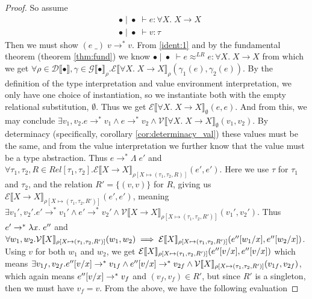 \documentclass[twoside,11pt,openright]{report}
\theoremstyle{definition}
\newcommand{\var}{x}
\newcommand{\expr}{e}
\newcommand{\val}{v}
\newcommand{\valB}{w}
\newcommand{\Tvar}{X}
\newcommand{\Tlam}{\Lambda\;}
\newcommand{\Tapp}[1]{#1\;\_}
\newcommand{\subst}[3]{#1{\left[#3 \middle/ #2 \right]}}
\newcommand{\Tfunc}[2]{#1 \rightarrow #2}
\newcommand{\Tall}[2]{\forall #1.\; #2}
\newcommand{\typ}{\tau}
\newcommand{\emptenv}{\bullet}
\newcommand{\empvenv}{\bullet}
\newcommand{\jdg}[4]{#1 \; | \; #2 \; \vdash #3 : #4}
\newcommand{\jdgRel}[6]{#1 \; | \; #2 \; \vdash #3 \approx^{#4} #5 : #6}
\newcommand{\stepS}{\rightarrow^*}
\newcommand{\ValInp}[2]{\mathcal{V} \llbracket #1 \rrbracket_{#2}}
\newcommand{\ExpInp}[2]{\mathcal{E} \llbracket #1 \rrbracket_{#2}}
\newcommand{\VenvInp}[2]{\mathcal{G} \llbracket #1 \rrbracket_{#2}}
\newcommand{\TenvInp}[1]{\mathcal{D} \llbracket #1 \rrbracket}
\newcommand{\LogRel}[5]{\jdgRel{#1}{#2}{#3}{LR}{#4}{#5}}
\newcommand{\map}[2]{#1 \mapsto #2}
\begin{document}
\begin{proof}
  So assume
  \begin{align}
    &\jdg{\emptenv}{\empvenv}{\expr}{\Tall{\Tvar}{\Tfunc{\Tvar}{\Tvar}}}\label{ident:1}\\
    &\jdg{\emptenv}{\empvenv}{\val}{\typ}
  \end{align}
  Then we must show $(\Tapp{\expr}) \; \val \stepS \val$. From \ref*{ident:1} and by the fundamental theorem (theorem \ref{thm:fund}) we know $\LogRel{\emptenv}{\empvenv}{\expr}{\expr}{\Tall{\Tvar}{\Tfunc{\Tvar}{\Tvar}}}$ from which we get $\forall \rho \in \TenvInp{\emptenv}, \gamma \in \VenvInp{\empvenv}{\rho} . \ExpInp{\Tall{\Tvar}{\Tfunc{\Tvar}{\Tvar}}}{\rho}(\gamma_1(\expr), \gamma_2(\expr))$. By the definition of the type interpretation and value environment interpretation, we only have one choice of instantiation, so we instantiate both with the empty relational substitution, $\emptyset$. Thus we get $\ExpInp{\Tall{\Tvar}{\Tfunc{\Tvar}{\Tvar}}}{\emptyset}(\expr, \expr)$. And from this, we may conclude $\exists \val_1, \val_2 . \expr \stepS \val_1 \land \expr \stepS \val_2 \land \ValInp{\Tall{\Tvar}{\Tfunc{\Tvar}{\Tvar}}}{\emptyset}(\val_1, \val_2)$. By determinacy (specifically, corollary \ref{cor:determinacy_val}) these values must be the same, and from the value interpretation we further know that the value must be a type abstraction. Thus $\expr \stepS \Tlam \expr'$ and $\forall \typ_1, \typ_2, R \in Rel[\typ_1, \typ_2] . \ExpInp{\Tfunc{\Tvar}{\Tvar}}{\rho[\map{\Tvar}{(\typ_1, \typ_2, R)}]}(\expr', \expr')$. Here we use $\typ$ for $\typ_1$ and $\typ_2$, and the relation $R' = \{(\val, \val)\}$ for $R$, giving us $\ExpInp{\Tfunc{\Tvar}{\Tvar}}{\rho[\map{\Tvar}{(\typ_1, \typ_2, R')}]}(\expr', \expr')$, meaning $\exists \val_1', \val_2' . \expr' \stepS \val_1' \land \expr' \stepS \val_2' \land \ValInp{\Tfunc{\Tvar}{\Tvar}}{\rho[\map{\Tvar}{(\typ_1, \typ_2, R')}]}(\val_1', \val_2')$. Thus $\expr' \stepS \fun \var . \expr''$ and $\forall \valB_1, \valB_2 . \ValInp{\Tvar}{\rho[\map{\Tvar}{(\typ_1, \typ_2, R')}]}(\valB_{1}, \valB_{2}) \implies \ExpInp{\Tvar}{\rho[\map{\Tvar}{(\typ_1, \typ_2, R')}]}(\subst{\expr''}{\var}{\valB_1}, \subst{\expr''}{\var}{\valB_2})$. Using $\val$ for both $\valB_1$ and $\valB_2$, we get $\ExpInp{\Tvar}{\rho[\map{\Tvar}{(\typ_1, \typ_2, R')}]}(\subst{\expr''}{\var}{\val}, \subst{\expr''}{\var}{\val})$ which means 
  $\exists \val_{1f}, \val_{2f} . \subst{\expr''}{\var}{\val} \stepS \val_{1f} \land \subst{\expr''}{\var}{\val} \stepS \val_{2f} \land \ValInp{\Tvar}{\rho[\map{\Tvar}{(\typ_1, \typ_2, R')}]}(\val_{1f}, \val_{2f})$, which again means $\subst{\expr''}{\var}{\val} \stepS \val_f$ and $(\val_f, \val_f) \in R'$, but since $R'$ is a singleton, then we must have $\val_f = \val$. From the above, we have the following evaluation

\end{proof}
\end{document}
